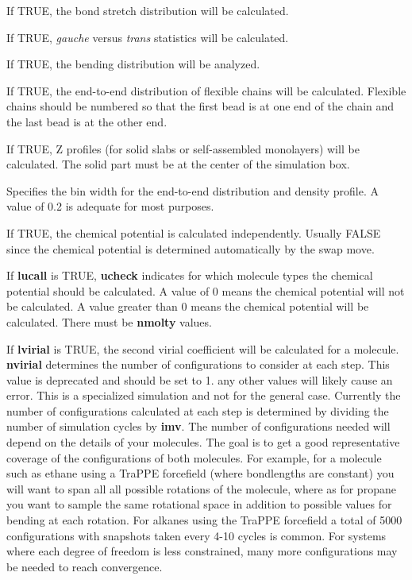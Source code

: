 \documentclass[12pt,letterpaper]{article}
\begin{document}
 If TRUE, the bond stretch distribution will be calculated.

 If TRUE, \textit{gauche} versus
\textit{trans} statistics will be calculated.

 If TRUE, the bending distribution will be analyzed.

 If TRUE, the end-to-end distribution of
flexible chains will be calculated. Flexible chains should
be numbered so that the first bead is at one end of the
chain and the last bead is at the other end.

 If TRUE, Z profiles (for solid slabs
or self-assembled monolayers) will be calculated. The solid
part must be at the center of the simulation box.

 Specifies the bin width for the
end-to-end distribution and density profile. A value of 0.2
is adequate for most purposes.

 If TRUE, the chemical potential is
calculated independently. Usually FALSE since the chemical
potential is determined automatically by the swap move.

 If {\bf lucall} is TRUE, {\bf ucheck}
indicates for which molecule types the chemical potential
should be calculated. A value of 0 means the chemical
potential will not be calculated. A value greater than 0
means the chemical potential will be calculated. There must
be {\bf nmolty} values.

 If {\bf lvirial} is TRUE, the second
virial coefficient will be calculated for a molecule. {\bf
  nvirial} determines the number of configurations to
consider at each step. This value is deprecated and should
be set to 1. any other values will likely cause an error.
This is a specialized simulation and not for the general case.
Currently the number of configurations calculated at each step
is determined by dividing the number of simulation cycles by 
{\bf imv}. The number of configurations needed will depend on 
the details of your molecules. The goal is to get a good
representative coverage of the configurations of both molecules.
For example, for a molecule such as ethane using a TraPPE forcefield
(where bondlengths are constant) you will want to span all
all possible rotations of the molecule, where as for propane you want
to sample the same rotational space in addition to possible values for
bending at each rotation. For alkanes using the TraPPE forcefield a total
of 5000 configurations with snapshots taken every 4-10 cycles is common.
For systems where each degree of freedom is less constrained, many more
configurations may be needed to reach convergence. 
\end{document}
